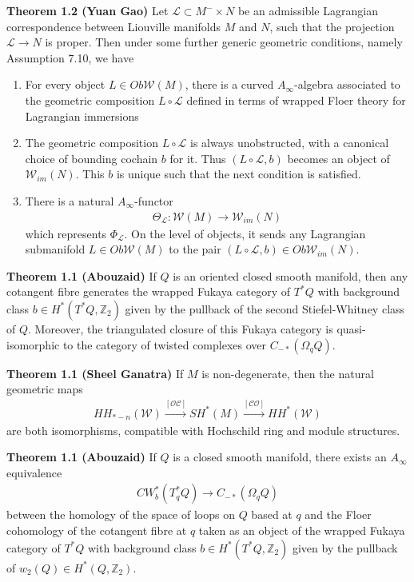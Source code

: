 \documentclass[hidelinks, 12pt]{article}
\theoremstyle{mydefstyle}
\theoremstyle{mythmstyle}
\newcounter{prop}
\begin{document}
\textbf{Theorem 1.2 (Yuan Gao)} Let $\mathcal{L} \subset M^- \times N$ be an admissible Lagrangian correspondence between Liouville manifolds $M$ and $N$, such that the projection $\mathcal{L} \to N$ is proper. Then under some further generic geometric conditions, namely Assumption 7.10, we have
\begin{enumerate}[label = (\roman*)]
\item For every object $L \in Ob\mathcal{W}(M)$, there is a curved $A_{\infty}$-algebra associated to the geometric composition $L \circ \mathcal{L}$ defined in terms of wrapped Floer theory for Lagrangian immersions
\item The geometric composition $L \circ \mathcal{L}$ is always unobstructed, with a canonical choice of bounding cochain $b$ for it. Thus $(L \circ \mathcal{L}, b)$ becomes an object of $\mathcal{W}_{im}(N)$. This $b$ is unique such that the next condition is satisfied.
\item There is a natural $A_{\infty}$-functor
\begin{gather*}
\Theta_{\mathcal{L}} : \mathcal{W}(M) \to \mathcal{W}_{im}(N)
\end{gather*}
which represents $\Phi_{\mathcal{L}}$. On the level of objects, it sends any Lagrangian submanifold $L \in Ob\mathcal{W}(M)$ to the pair $(L \circ \mathcal{L}, b) \in Ob\mathcal{W}_{im}(N)$. 
\end{enumerate}

\textbf{Theorem 1.1 (Abouzaid)} If $Q$ is an oriented closed smooth manifold, then any cotangent fibre generates the wrapped Fukaya category of $T^*Q$ with background class $b \in H^*(T^*Q, \mathbb{Z}_2)$ given by the pullback of the second Stiefel-Whitney class of $Q$. Moreover, the triangulated closure of this Fukaya category is quasi-isomorphic to the category of twisted complexes over $C_{-*}(\Omega_qQ)$. 

\textbf{Theorem 1.1 (Sheel Ganatra)} If $M$ is non-degenerate, then the natural geometric maps
\begin{gather*}
HH_{*-n}(\mathcal{W}) \xrightarrow{[\mathcal{OC}]} SH^*(M) \xrightarrow{[\mathcal{CO}]} HH^*(\mathcal{W})
\end{gather*}
are both isomorphisms, compatible with Hochschild ring and module structures.

\textbf{Theorem 1.1 (Abouzaid)} If $Q$ is a closed smooth manifold, there exists an $A_{\infty}$ equivalence
\begin{gather*}
CW_b^*(T_q^*Q) \to C_{-*}(\Omega_q Q)
\end{gather*}
between the homology of the space of loops on $Q$ based at $q$ and the Floer cohomology of the cotangent fibre at $q$ taken as an object of the wrapped Fukaya category of $T^*Q$ with background class $b \in H^*(T^*Q, \mathbb{Z}_2)$ given by the pullback of $w_2(Q) \in H^*(Q, \mathbb{Z}_2)$. 
\end{document}
